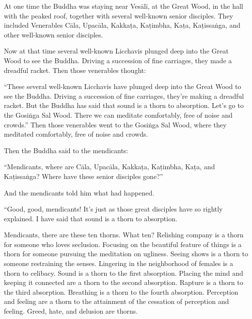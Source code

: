 \documentclass[12pt,openany]{book}%
\begin{document}
At one time the Buddha was staying near \textsanskrit{Vesālī}, at the Great Wood, in the hall with the peaked roof, together with several well-known senior disciples. They included Venerables \textsanskrit{Cāla}, \textsanskrit{Upacāla}, \textsanskrit{Kakkaṭa}, \textsanskrit{Kaṭimbha}, \textsanskrit{Kaṭa}, \textsanskrit{Kaṭissaṅga}, and other well-known senior disciples. 

Now at that time several well-known Licchavis plunged deep into the Great Wood to see the Buddha. Driving a succession of fine carriages, they made a dreadful racket. Then those venerables thought: 

“These several well-known Licchavis have plunged deep into the Great Wood to see the Buddha. Driving a succession of fine carriages, they’re making a dreadful racket. But the Buddha has said that sound is a thorn to absorption. Let’s go to the \textsanskrit{Gosiṅga} Sal Wood. There we can meditate comfortably, free of noise and crowds.” Then those venerables went to the \textsanskrit{Gosiṅga} Sal Wood, where they meditated comfortably, free of noise and crowds. 

Then the Buddha said to the mendicants: 

“Mendicants, where are \textsanskrit{Cāla}, \textsanskrit{Upacāla}, \textsanskrit{Kakkaṭa}, \textsanskrit{Kaṭimbha}, \textsanskrit{Kaṭa}, and \textsanskrit{Kaṭissaṅga}? Where have these senior disciples gone?” 

And the mendicants told him what had happened. 

“Good, good, mendicants! It’s just as those great disciples have so rightly explained. I have said that sound is a thorn to absorption. 

Mendicants, there are these ten thorns. What ten? Relishing company is a thorn for someone who loves seclusion. Focusing on the beautiful feature of things is a thorn for someone pursuing the meditation on ugliness. Seeing shows is a thorn to someone restraining the senses. Lingering in the neighborhood of females is a thorn to celibacy. Sound is a thorn to the first absorption. Placing the mind and keeping it connected are a thorn to the second absorption. Rapture is a thorn to the third absorption. Breathing is a thorn to the fourth absorption. Perception and feeling are a thorn to the attainment of the cessation of perception and feeling. Greed, hate, and delusion are thorns. 
\end{document}
